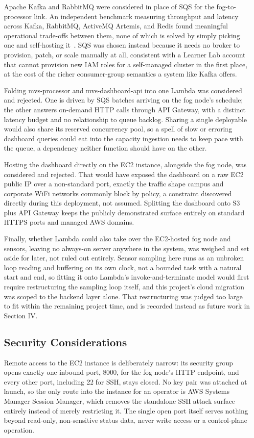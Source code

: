 \documentclass[conference]{IEEEtran}
\begin{document}
Apache Kafka and RabbitMQ were considered in place of SQS for the fog-to-processor link. An independent benchmark measuring throughput and latency across Kafka, RabbitMQ, ActiveMQ Artemis, and Redis found meaningful operational trade-offs between them, none of which is solved by simply picking one and self-hosting it~\cite{ref5}. SQS was chosen instead because it needs no broker to provision, patch, or scale manually at all, consistent with a Learner Lab account that cannot provision new IAM roles for a self-managed cluster in the first place, at the cost of the richer consumer-group semantics a system like Kafka offers.

Folding mvs-processor and mvs-dashboard-api into one Lambda was considered and rejected. One is driven by SQS batches arriving on the fog node's schedule; the other answers on-demand HTTP calls through API Gateway, with a distinct latency budget and no relationship to queue backlog. Sharing a single deployable would also share its reserved concurrency pool, so a spell of slow or erroring dashboard queries could eat into the capacity ingestion needs to keep pace with the queue, a dependency neither function should have on the other.

Hosting the dashboard directly on the EC2 instance, alongside the fog node, was considered and rejected. That would have exposed the dashboard on a raw EC2 public IP over a non-standard port, exactly the traffic shape campus and corporate WiFi networks commonly block by policy, a constraint discovered directly during this deployment, not assumed. Splitting the dashboard onto S3 plus API Gateway keeps the publicly demonstrated surface entirely on standard HTTPS ports and managed AWS domains.

Finally, whether Lambda could also take over the EC2-hosted fog node and sensors, leaving no always-on server anywhere in the system, was weighed and set aside for later, not ruled out entirely. Sensor sampling here runs as an unbroken loop reading and buffering on its own clock, not a bounded task with a natural start and end, so fitting it onto Lambda's invoke-and-terminate model would first require restructuring the sampling loop itself, and this project's cloud migration was scoped to the backend layer alone. That restructuring was judged too large to fit within the remaining project time, and is recorded instead as future work in Section IV.

\subsection{Security Considerations}
Remote access to the EC2 instance is deliberately narrow: its security group opens exactly one inbound port, 8000, for the fog node's HTTP endpoint, and every other port, including 22 for SSH, stays closed. No key pair was attached at launch, so the only route into the instance for an operator is AWS Systems Manager Session Manager, which removes the standalone SSH attack surface entirely instead of merely restricting it. The single open port itself serves nothing beyond read-only, non-sensitive status data, never write access or a control-plane operation.
\end{document}
